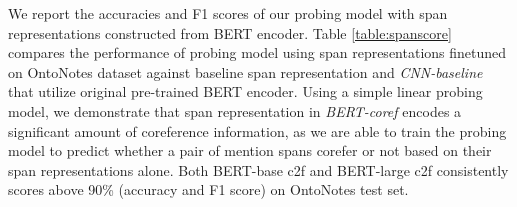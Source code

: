 \documentclass[11pt]{article}
\begin{document}







We report the accuracies and F1 scores of our probing model with span representations constructed from BERT encoder. Table \ref{table:spanscore} compares the performance of probing model using span representations finetuned on OntoNotes dataset against baseline span representation and \textit{CNN-baseline} that utilize original pre-trained BERT encoder. Using a simple linear probing model, we demonstrate that span representation in \textit{BERT-coref} encodes a significant amount of coreference information, as we are able to train the probing model to predict whether a pair of mention spans corefer or not based on their span representations alone. Both BERT-base c2f and BERT-large c2f consistently scores above 90\% (accuracy and F1 score) on OntoNotes test set. 
\end{document}
